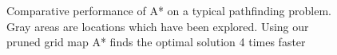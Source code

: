 \begin{figure}[t]
	\label{fig:csc2f}
	\centering
\caption{Comparative performance of A* on a typical pathfinding problem.
Gray areas are locations which have been explored. 
Using our pruned grid map A* finds the optimal solution 4 times faster}
\vspace{1em}
 \end{figure}
